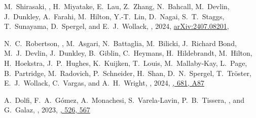 
\item
M.~Shirasaki, \myself, H.~Miyatake, E.~Lau, Z.~Zhang, N.~Bahcall, M.~Devlin, J.~Dunkley, A.~Farahi, M.~Hilton, Y.-T.~Lin, D.~Nagai, S.~T.~Staggs, T.~Sunayama, D.~Spergel, and E.~J.~Wollack,
,
2024, \href{https://ui.adsabs.harvard.edu/abs/2024arXiv240708201S}{arXiv:2407.08201},
\accepted{\prd}

\item
N.~C.~Robertson, \myself, M.~Asgari, N.~Battaglia, M.~Bilicki, J.~Richard Bond, M.~J.~Devlin, J.~Dunkley, B.~Giblin, C.~Heymans, H.~Hildebrandt, M.~Hilton, H.~Hoekstra, J.~P.~Hughes, K.~Kuijken, T.~Louis, M.~Mallaby-Kay, L.~Page, B.~Partridge, M.~Radovich, P.~Schneider, H.~Shan, D.~N.~Spergel, T.~Tröster, E.~J.~Wollack, C.~Vargas, and A.~H.~Wright,
,
2024, \href{https://ui.adsabs.harvard.edu/abs/2024A&A...681A..87R}{\aap, 681, A87}

\item
A.~Dolfi, F.~A.~Gómez, A.~Monachesi, S.~Varela-Lavin, P.~B.~Tissera, \myself, and G.~Galaz,
,
2023, \href{https://ui.adsabs.harvard.edu/abs/2023MNRAS.526..567D}{\mnras, 526, 567}

